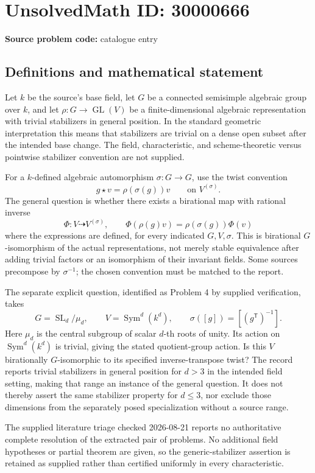 \documentclass[11pt]{article}
\begin{document}
\section*{UnsolvedMath ID: 30000666}
\textbf{Source problem code:} catalogue entry
\subsection{Definitions and mathematical statement}
Let \(k\) be the source's base field, let \(G\) be a connected semisimple algebraic group over \(k\), and let \(\rho:G\to\operatorname{GL}(V)\) be a finite-dimensional algebraic representation with trivial stabilizers in general position. In the standard geometric interpretation this means that stabilizers are trivial on a dense open subset after the intended base change. The field, characteristic, and scheme-theoretic versus pointwise stabilizer convention are not supplied.

For a \(k\)-defined algebraic automorphism \(\sigma:G\to G\), use the twist convention
\[
g\star v=\rho(\sigma(g))v\qquad\text{on }V^{(\sigma)}.
\]
The general question is whether there exists a birational map with rational inverse
\[
\Phi:V\dashrightarrow V^{(\sigma)},\qquad
\Phi(\rho(g)v)=\rho(\sigma(g))\Phi(v)
\]
where the expressions are defined, for every indicated \(G,V,\sigma\). This is birational \(G\)-isomorphism of the actual representations, not merely stable equivalence after adding trivial factors or an isomorphism of their invariant fields. Some sources precompose by \(\sigma^{-1}\); the chosen convention must be matched to the report.

The separate explicit question, identified as Problem 4 by supplied verification, takes
\[
G=\operatorname{SL}_d/\mu_d,\qquad V=\operatorname{Sym}^d(k^d),\qquad
\sigma([g])=[(g^{\mathsf T})^{-1}].
\]
Here \(\mu_d\) is the central subgroup of scalar \(d\)-th roots of unity. Its action on \(\operatorname{Sym}^d(k^d)\) is trivial, giving the stated quotient-group action. Is this \(V\) birationally \(G\)-isomorphic to its specified inverse-transpose twist? The record reports trivial stabilizers in general position for \(d>3\) in the intended field setting, making that range an instance of the general question. It does not thereby assert the same stabilizer property for \(d\leq3\), nor exclude those dimensions from the separately posed specialization without a source range.

The supplied literature triage checked 2026-08-21 reports no authoritative complete resolution of the extracted pair of problems. No additional field hypotheses or partial theorem are given, so the generic-stabilizer assertion is retained as supplied rather than certified uniformly in every characteristic.
\end{document}

